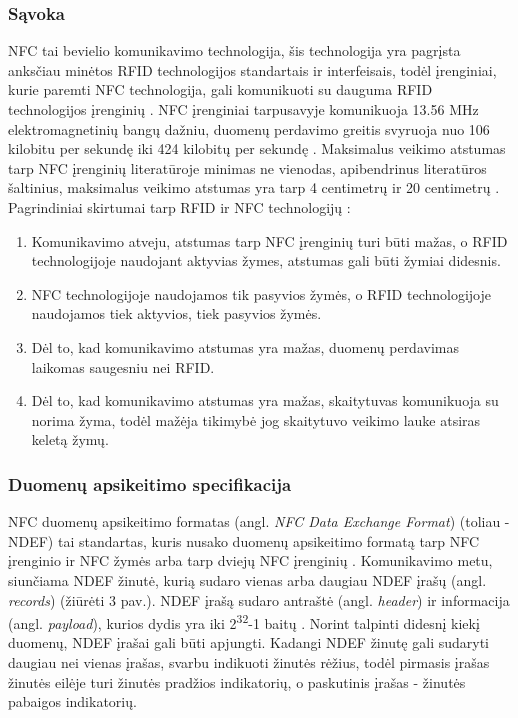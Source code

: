 \subsubsection{Sąvoka}
NFC tai bevielio komunikavimo technologija, šis technologija yra pagrįsta anksčiau minėtos RFID technologijos standartais ir interfeisais, todėl įrenginiai, kurie paremti NFC technologija, gali komunikuoti su dauguma RFID technologijos įrenginių \cite{Motlagh2012}. NFC įrenginiai tarpusavyje komunikuoja 13.56 MHz elektromagnetinių bangų dažniu, duomenų perdavimo greitis svyruoja nuo 106 kilobitu per sekundę iki 424 kilobitų per sekundę \cite{whitepapaer}. Maksimalus veikimo atstumas tarp NFC įrenginių literatūroje minimas ne vienodas, apibendrinus literatūros šaltinius, maksimalus veikimo atstumas yra tarp 4 centimetrų ir 20 centimetrų \cite{whitepapaer} \cite{Motlagh2012} \cite{Leora1980}. Pagrindiniai skirtumai tarp RFID ir NFC technologijų \cite{Leora1980}:
\begin{enumerate}
    \item Komunikavimo atveju, atstumas tarp NFC įrenginių turi būti mažas, o RFID technologijoje naudojant aktyvias žymes, atstumas gali būti žymiai didesnis.
    \item NFC technologijoje naudojamos tik pasyvios žymės, o RFID technologijoje naudojamos tiek aktyvios, tiek pasyvios žymės.
    \item Dėl to, kad komunikavimo atstumas yra mažas, duomenų perdavimas laikomas saugesniu nei RFID.
    \item Dėl to, kad komunikavimo atstumas yra mažas, skaitytuvas komunikuoja su norima žyma, todėl mažėja tikimybė jog skaitytuvo veikimo lauke atsiras keletą žymų.
\end{enumerate}
 

\subsubsection{Duomenų apsikeitimo specifikacija}
NFC duomenų apsikeitimo formatas (angl. \textit{NFC Data Exchange Format}) (toliau - NDEF) tai standartas, kuris nusako duomenų apsikeitimo formatą tarp NFC įrenginio ir NFC žymės arba tarp dviejų NFC įrenginių \cite{Leora1980}. Komunikavimo metu, siunčiama NDEF žinutė, kurią sudaro vienas arba daugiau NDEF įrašų (angl. \textit{records}) (žiūrėti 3 pav.). NDEF įrašą sudaro antraštė (angl. \textit{header}) ir informacija (angl. \textit{payload}), kurios dydis yra iki 2\textsuperscript{32}-1 baitų \cite{NFCForum2006}. Norint talpinti didesnį kiekį duomenų, NDEF įrašai gali būti apjungti. Kadangi NDEF žinutę gali sudaryti daugiau nei vienas įrašas, svarbu indikuoti žinutės rėžius, todėl pirmasis įrašas žinutės eilėje turi žinutės pradžios indikatorių, o paskutinis įrašas - žinutės pabaigos indikatorių.

